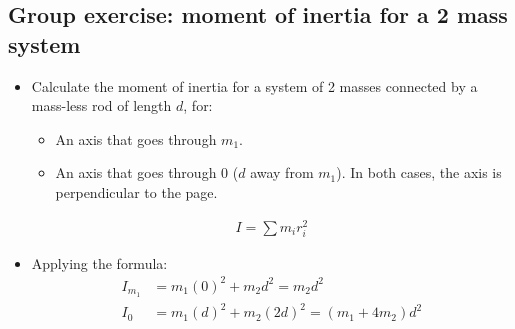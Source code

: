 \documentclass[aspectratio=169,
hyperref={colorlinks,urlcolor=blue}
]{beamer}
\begin{document}
\subsection{Group exercise: moment of inertia for a 2 mass system}
\label{subsec:}
{
\begin{itemize}
\item Calculate the moment of inertia for a system of 2 masses connected by a mass-less rod of length $d$, for:
\begin{itemize}
\item An axis that goes through $m_1$.
\item An axis that goes through 0 ($d$ away from $m_1$).
In both cases, the axis is perpendicular to the page.
\end{itemize}
\begin{align*}
I=\sum m_ir_i^2  
\end{align*}
\item<2> Applying the formula:
\begin{align*}
I_{m_1}&=m_1(0)^2+m_2d^2=m_2d^2\\
I_{0}&=m_1(d)^2+m_2(2d)^2=(m_1+4m_2)d^2\\
\end{align*}
\end{itemize}
}
{
\begin{center}
\end{center}
}





\end{document}
